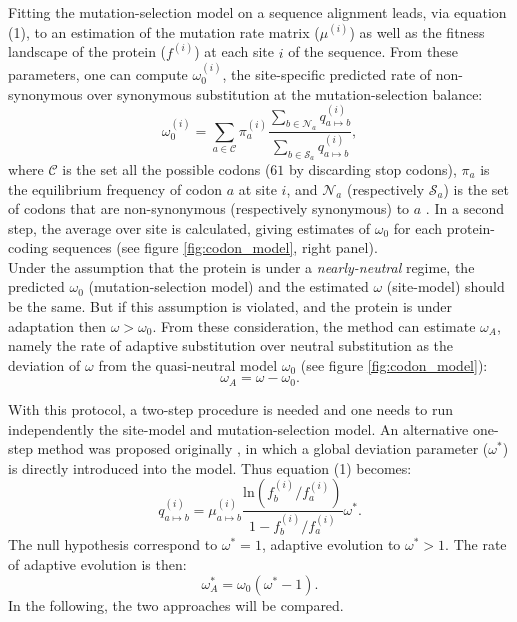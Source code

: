 \documentclass{article}
\begin{document}
	Fitting the mutation-selection model on a sequence alignment leads, via equation (1), to an estimation of the mutation rate matrix ($\mu^{(i)}$) as well as the fitness landscape of the protein ($f^{(i)}$) at each site $i$ of the sequence. From these parameters, one can compute $\omega_{0}^{(i)}$, the site-specific predicted rate of non-synonymous over synonymous substitution at the mutation-selection balance: 
	\begin{equation}
	\omega_{0}^{(i)} = \sum_{a \in  \mathcal{C}} \pi_a^{(i)}  \dfrac{\sum_{b \in  \mathcal{N}_a} q_{a \mapsto b}^{(i)}}{\sum_{b \in \mathcal{S}_a} q_{a \mapsto b}^{(i)}},
	\end{equation}
	where $\mathcal{C}$ is the set all the possible codons ($61$ by discarding stop codons), $\pi_a$ is the equilibrium frequency of codon $a$ at site $i$, and $\mathcal{N}_a$ (respectively $\mathcal{S}_a$) is the set of codons that are non-synonymous (respectively synonymous) to $a$  \cite{spielman_relationship_2015, rodrigue_site-heterogeneous_2014}. In a second step, the average over site is calculated, giving estimates of $\omega_0$ for each protein-coding sequences (see figure \ref{fig:codon_model}, right panel). \\
	
	Under the assumption that the protein is under a \textit{nearly-neutral} regime,  the predicted $\omega_0$ (mutation-selection model) and the estimated $\omega$ (site-model) should be the same. But if this assumption is violated, and the protein is under adaptation then $\omega > \omega_0$.
	From these consideration, the method can estimate $\omega_A$, namely the rate of adaptive substitution over neutral substitution as the deviation of $\omega$ from the quasi-neutral model $\omega_0$ (see figure \ref{fig:codon_model}):
	\begin{equation}
		\omega_A = \omega - \omega_0.
	\end{equation}
	
	With this protocol, a two-step procedure is needed and one needs to run independently the site-model and mutation-selection model. An alternative one-step method was proposed originally \cite{Rodrigue2016}, in which a global deviation parameter ($\omega^*$) is directly introduced into the model. Thus equation (1) becomes:
	\begin{equation}
	q_{a \mapsto b}^{(i)} =  \mu_{a \mapsto b}^{(i)} \dfrac{\mathrm{ln}(f_b^{(i)} / f_a^{(i)})}{1 - f_b^{(i)} / f_a^{(i)}} \omega^* .
	\end{equation}
	The null hypothesis correspond to $\omega^*=1$, adaptive evolution to $\omega^*>1$. The rate of adaptive evolution is then:
	\begin{equation}
		\omega_A^* = \omega_0 (\omega^* - 1 ).
	\end{equation}
	In the following, the two approaches will be compared.
\end{document}
